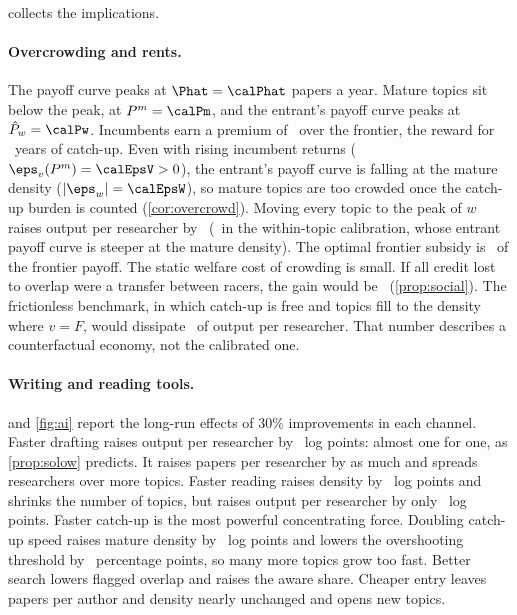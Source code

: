  collects the implications.

\begin{table}[t]
\centering\small
\caption{Rents, overcrowding and growth in the calibrated model}\label{tab:welfare}

\end{table}

\paragraph{Overcrowding and rents.} The payoff curve peaks at $\Phat=\calPhat$
papers a year. Mature topics sit below the peak, at $P^m=\calPm$, and the
entrant's payoff curve peaks at $\hat P_w=\calPw$. Incumbents earn a premium of
\calPremium\ over the frontier, the reward for \calT\ years of catch-up. Even
with rising incumbent returns ($\eps_v(P^m)=\calEpsV>0$), the entrant's payoff
curve is falling at the mature density ($|\eps_w|=\calEpsW$), so mature topics are
too crowded once the catch-up burden is counted (\cref{cor:overcrowd}). Moving
every topic to the peak of $w$ raises output per researcher by \calPlannerGain\
(\calWPlannerGain\ in the within-topic calibration, whose entrant payoff curve is
steeper at the mature density). The optimal frontier subsidy is \calSubsidy\ of the
frontier payoff. The static welfare cost of crowding is small. If all credit
lost to overlap were a transfer between racers, the gain would be
\calGainTransfer\ (\cref{prop:social}). The frictionless benchmark, in which catch-up
is free and topics fill to the density where $v=F$, would dissipate
\calDissip\ of output per researcher. That number describes a counterfactual
economy, not the calibrated one.

\paragraph{Writing and reading tools.}  and \cref{fig:ai} report the
long-run effects of 30\% improvements in each channel. Faster drafting raises
output per researcher by \calWriteOut\ log points: almost one for one, as
\cref{prop:solow} predicts. It raises papers per researcher by as much and
spreads researchers over more topics. Faster reading raises density by
\calReadDens\ log points and shrinks the number of topics, but raises output per
researcher by only \calReadOut\ log points. Faster catch-up is the most powerful
concentrating force. Doubling catch-up speed raises mature density by
\calCatchDens\ log points and lowers the overshooting threshold by
\calCatchGstar\ percentage points, so many more topics grow too fast. Better
search lowers flagged overlap and raises the aware share. Cheaper entry leaves
papers per author and density nearly unchanged and opens new topics.

